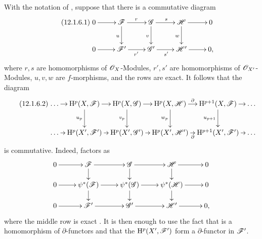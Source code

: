 \begin{remark}[12.1.6]
\label{0.12.1.6}
With the notation of , suppose that there is a
commutative diagram
\[
\label{0.12.1.6.1}
\tag{12.1.6.1}
  \xymatrix{
    0\ar[r] & \sh{F}\ar[r]^r\ar[d]_u
      & \sh{G}\ar[r]^s\ar[d]_v
      & \sh{H}\ar[r]\ar[d]_w & 0\\
    0\ar[r] & \sh{F}'\ar[r]_{r'}
      & \sh{G}'\ar[r]_{s'}
      & \sh{H}'\ar[r] & 0,
  }
\]
where $r,s$ are homomorphisms of $\mathscr{O}_X$-Modules,
$r',s'$ are homomorphisms of $\mathscr{O}_{X'}$-Modules,
$u,v,w$ are $f$-morphisms, and the rows are exact.
It follows that the diagram
\[
\label{0.12.1.6.2}
\tag{12.1.6.2}
  \xymatrix@C=6pt{
    \ldots\ar[r]
      & \HH^p(X,\sh{F})\ar[r]\ar[d]_{u_p}
      & \HH^p(X,\sh{G})\ar[r]\ar[d]_{v_p}
      & \HH^p(X,\sh{H})\ar[r]^-\partial\ar[d]_{w_p}
      & \HH^{p+1}(X,\sh{F})\ar[r]\ar[d]_{u_{p+1}}
      & \ldots\\
    \ldots\ar[r]
      & \HH^p(X',\sh{F}')\ar[r]
      & \HH^p(X',\sh{G}')\ar[r]
      & \HH^p(X',\sh{H}')\ar[r]_-\partial
      & \HH^{p+1}(X',\sh{F}')\ar[r]
      & \ldots
  }
\]
is commutative.
Indeed,  factors as
\[
  \xymatrix@R=14pt{
    0\ar[r] & \sh{F}\ar[r]\ar[d]
      & \sh{G}\ar[r]\ar[d]
      & \sh{H}\ar[r]\ar[d] & 0\\
    0\ar[r] & \psi^*(\sh{F})\ar[r]\ar[d]
      & \psi^*(\sh{G})\ar[r]\ar[d]
      & \psi^*(\sh{H})\ar[r]\ar[d] & 0\\
    0\ar[r] & \sh{F}'\ar[r]
      & \sh{G}'\ar[r]
      & \sh{H}'\ar[r] & 0,
  }
\]
where the middle row is exact
.
It is then enough to use the fact that  is a
homomorphism of $\partial$-functors and that the
$\mathrm{H}^p(X',\mathscr{F}')$ form a $\partial$-functor in $\mathscr{F}'$.
\end{remark}

